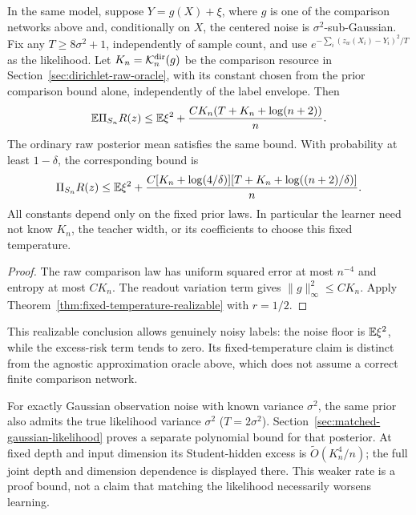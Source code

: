 \begin{corollary}
\label{cor:main-raw-fixed-temperature}
In the same model, suppose $Y=g(X)+\xi$, where $g$ is one of the
comparison networks above and, conditionally on $X$, the centered noise
is $\sigma^2$-sub-Gaussian. Fix any $T\ge8\sigma^2+1$, independently of
sample count, and use $e^{-\sum_i(z_w(X_i)-Y_i)^2/T}$ as the likelihood.
Let $K_n=\mathcal K_n^{\rm dir}(g)$ be the comparison resource in
Section~\ref{sec:dirichlet-raw-oracle}, with its constant chosen from
the prior comparison bound alone, independently of the label envelope.
Then
\[
 \mathbb E\Pi_{S_n}R(z)\le\mathbb E\xi^2+
             \frac{C K_n(T+K_n+\log(n+2))}{n}.
\]
The ordinary raw posterior mean satisfies the same bound. With
probability at least $1-\delta$, the corresponding bound is
\[
 \Pi_{S_n}R(z)\le\mathbb E\xi^2+
 \frac{C[K_n+\log(4/\delta)]
       [T+K_n+\log((n+2)/\delta)]}{n}.
\]
All constants depend only on the fixed prior laws. In particular the
learner need not know $K_n$, the teacher width, or its coefficients to
choose this fixed temperature.
\end{corollary}
\begin{proof}
The raw comparison law has uniform squared error at most $n^{-4}$ and
entropy at most $CK_n$. The readout variation term gives
$\|g\|_\infty^2\le C K_n$. Apply
Theorem~\ref{thm:fixed-temperature-realizable} with $r=1/2$.
\end{proof}
This realizable conclusion allows genuinely noisy labels: the noise
floor is $\mathbb E\xi^2$, while the excess-risk term tends to zero. Its
fixed-temperature claim is distinct from the agnostic approximation
oracle above, which does not assume a correct finite comparison network.


For exactly Gaussian observation noise with known variance $\sigma^2$,
the same prior also admits the true likelihood variance $\sigma^2$
($T=2\sigma^2$). Section~\ref{sec:matched-gaussian-likelihood} proves a
separate polynomial bound for that posterior. At fixed depth and input
dimension its Student-hidden excess is $\widetilde O(K_n^4/n)$;
the full joint depth and dimension dependence is displayed there.
This weaker rate is a proof bound, not a claim that matching the
likelihood necessarily worsens learning.
